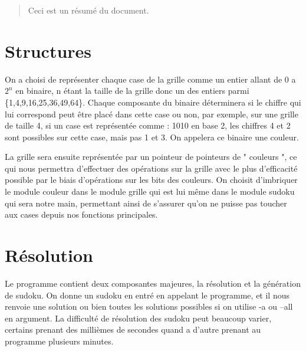 \documentclass[11pt,a4paper]{article}
\author{Briac Bruneau}
\begin{document}
\maketitle

\begin{abstract}
Ceci est un résumé du document.
\end{abstract}
\tableofcontents


\vspace{30}

\section{Structures}


\hspace{10} 
On a choisi de représenter chaque case de la grille comme un entier allant de 0 a $2^n$ en binaire, n étant la taille de la grille donc un des entiers parmi \{1,4,9,16,25,36,49,64\}. Chaque composante du binaire déterminera si le chiffre qui lui correspond peut être placé dans cette case ou non, par exemple, sur une grille de taille 4, si un case est représentée comme : 1010 en base 2, les chiffres 4 et 2 sont possibles sur cette case, mais pas 1 et 3. On appelera ce binaire une couleur.

\hspace{10} 
La grille sera ensuite représentée par un pointeur de pointeurs de " couleurs ",  ce qui nous permettra d'effectuer des opérations sur la grille avec le plus d'efficacité possible par le biais d'opérations sur les bits des couleurs. 
On choisit d'imbriquer le module couleur dans le module grille qui est lui même dans le module sudoku qui sera notre main, permettant ainsi de s'assurer qu'on ne puisse pas toucher aux cases depuis nos fonctions principales.

\vspace{15}
\section{Résolution}
\hspace{10} 
Le programme contient deux composantes majeures, la résolution et la génération de sudoku. On donne un sudoku en entré en appelant le programme, et il nous renvoie une solution ou bien toutes les solutions possibles si on utilise -a ou --all en argument. La difficulté de résolution des sudoku peut beaucoup varier, certains prenant des millièmes de secondes quand a d'autre prenant au programme plusieurs minutes. 
\end{document}
